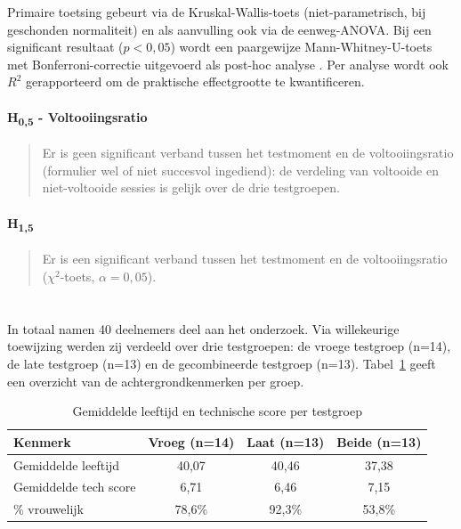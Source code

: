 Primaire toetsing gebeurt via de Kruskal-Wallis-toets (niet-parametrisch, bij geschonden normaliteit) en als aanvulling ook via de eenweg-ANOVA. Bij een significant resultaat ($p < 0{,}05$) wordt een paargewijze Mann-Whitney-U-toets met Bonferroni-correctie uitgevoerd als post-hoc analyse \autocite{Field2018}. Per analyse wordt ook $R^2$ gerapporteerd om de praktische effectgrootte te kwantificeren.

\paragraph{H\textsubscript{0,5} - Voltooiingsratio}
\begin{quote}
  Er is geen significant verband tussen het testmoment en de voltooiingsratio (formulier wel of niet succesvol ingediend): de verdeling van voltooide en niet-voltooide sessies is gelijk over de drie testgroepen.
\end{quote}
\paragraph{H\textsubscript{1,5}}
\begin{quote}
  Er is een significant verband tussen het testmoment en de voltooiingsratio ($\chi^2$-toets, $\alpha = 0{,}05$).
\end{quote}

\section{}

In totaal namen 40 deelnemers deel aan het onderzoek. Via willekeurige toewijzing werden zij verdeeld over drie testgroepen: de vroege testgroep (n=14), de late testgroep (n=13) en de gecombineerde testgroep (n=13). Tabel~\ref{tab:groepsverdeling} geeft een overzicht van de achtergrondkenmerken per groep.

\begin{table}[h]
  \centering
  \caption[Achtergrondkenmerken per testgroep]{Gemiddelde leeftijd en technische score per testgroep}
  \label{tab:groepsverdeling}
  \begin{tabular}{lccc}
    \hline
    \textbf{Kenmerk} & \textbf{Vroeg (n=14)} & \textbf{Laat (n=13)} & \textbf{Beide (n=13)} \\
    \hline
    Gemiddelde leeftijd     & 40,07 & 40,46 & 37,38 \\
    Gemiddelde tech score   & 6,71  & 6,46  & 7,15  \\
    \% vrouwelijk           & 78,6\% & 92,3\% & 53,8\% \\
    \hline
  \end{tabular}
\end{table}

